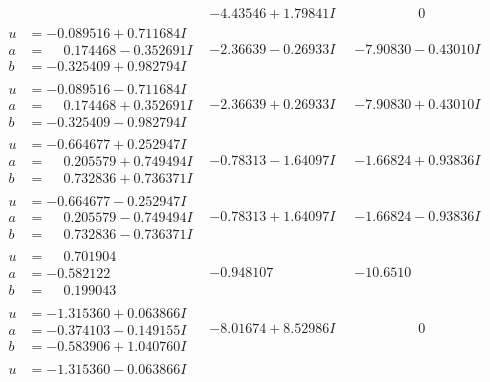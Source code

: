 \documentclass[1p]{elsarticle_modified}
\theoremstyle{definition}
\begin{document}
$$\begin{array}{c|c|c}
 & -4.43546 + 1.79841 I & \phantom{-0.000000 } 0 \\ \hline\begin{aligned}
u &= -0.089516 + 0.711684 I \\
a &= \phantom{-}0.174468 - 0.352691 I \\
b &= -0.325409 + 0.982794 I\end{aligned}
 & -2.36639 - 0.26933 I & -7.90830 - 0.43010 I \\ \hline\begin{aligned}
u &= -0.089516 - 0.711684 I \\
a &= \phantom{-}0.174468 + 0.352691 I \\
b &= -0.325409 - 0.982794 I\end{aligned}
 & -2.36639 + 0.26933 I & -7.90830 + 0.43010 I \\ \hline\begin{aligned}
u &= -0.664677 + 0.252947 I \\
a &= \phantom{-}0.205579 + 0.749494 I \\
b &= \phantom{-}0.732836 + 0.736371 I\end{aligned}
 & -0.78313 - 1.64097 I & -1.66824 + 0.93836 I \\ \hline\begin{aligned}
u &= -0.664677 - 0.252947 I \\
a &= \phantom{-}0.205579 - 0.749494 I \\
b &= \phantom{-}0.732836 - 0.736371 I\end{aligned}
 & -0.78313 + 1.64097 I & -1.66824 - 0.93836 I \\ \hline\begin{aligned}
u &= \phantom{-}0.701904\phantom{ +0.000000I} \\
a &= -0.582122\phantom{ +0.000000I} \\
b &= \phantom{-}0.199043\phantom{ +0.000000I}\end{aligned}
 & -0.948107\phantom{ +0.000000I} & -10.6510\phantom{ +0.000000I} \\ \hline\begin{aligned}
u &= -1.315360 + 0.063866 I \\
a &= -0.374103 - 0.149155 I \\
b &= -0.583906 + 1.040760 I\end{aligned}
 & -8.01674 + 8.52986 I & \phantom{-0.000000 } 0 \\ \hline\begin{aligned}
u &= -1.315360 - 0.063866 I \\

\end{aligned}
\end{array}$$
\end{document}
